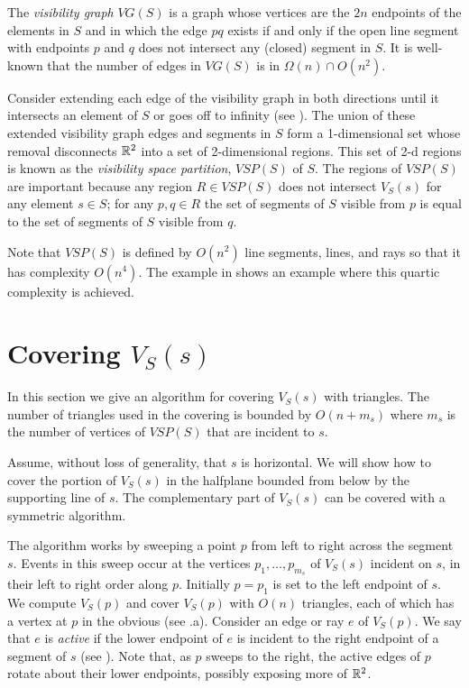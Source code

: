 \documentclass{patmorin}
\newcommand{\VG}{\mathit{VG}}
\newcommand{\VSP}{\mathit{VSP}}
\begin{document}
The \emph{visibility graph} $\VG(S)$ is a graph whose vertices are the $2n$
endpoints of the elements in $S$ and in which the edge $pq$ exists if and
only if the open line segment with endpoints $p$ and $q$ does not intersect
any (closed) segment in $S$.  It is well-known that the number of edges in
$\VG(S)$ is in $\Omega(n)\cap O(n^2)$.

Consider extending each edge of the visibility graph in both directions
until it intersects an element of $S$ or goes off to infinity (see
). The union of these extended visibility graph edges and
segments in $S$ form a 1-dimensional set whose removal disconnects $\mathbb{R}^2$
into a set of 2-dimensional regions.  This set of 2-d regions is known as
the \emph{visibility space partition}, $\VSP(S)$ of $S$.  The regions of
$\VSP(S)$ are important because any region $R\in\VSP(S)$ does not intersect
$V_S(s)$ for any element $s\in S$;  for any $p,q\in R$ the set of segments
of $S$ visible from $p$ is equal to the set of segments of $S$ visible from
$q$.  

Note that $\VSP(S)$ is defined by $O(n^2)$ line segments, lines, and rays
so that it has complexity $O(n^4)$.  The example in  shows
an example where this quartic complexity is achieved.

\section{Covering $V_S(s)$}

In this section we give an algorithm for covering $V_S(s)$ with triangles.
The number of triangles used in the covering is bounded by $O(n+m_s)$ where
$m_s$ is the number of vertices of $\VSP(S)$ that are incident to $s$.

Assume, without loss of generality, that $s$ is horizontal.  We will show
how to cover the portion of $V_S(s)$ in the halfplane bounded from below by
the supporting line of $s$.  The complementary part of $V_S(s)$ can be
covered with a symmetric algorithm.

The algorithm works by sweeping a point $p$ from left to right across the
segment $s$.  Events in this sweep occur at the vertices
$p_1,\ldots,p_{m_s}$ of $V_S(s)$
incident on $s$, in their left to right order along $p$.  Initially $p=p_1$ is set to the left endpoint of $s$.  We
compute $V_S(p)$ and cover $V_S(p)$ with $O(n)$ triangles, each of which
has a vertex at $p$ in the obvious (see .a).  Consider an edge or
ray $e$ of $V_S(p)$.  We say that $e$ is \emph{active} if the lower
endpoint of $e$ is incident to the right endpoint of a segment of $s$ (see
).  Note that, as $p$ sweeps to the right, the active edges of
$p$ rotate about their lower endpoints, possibly exposing more of $\mathbb{R}^2$.
\end{document}
